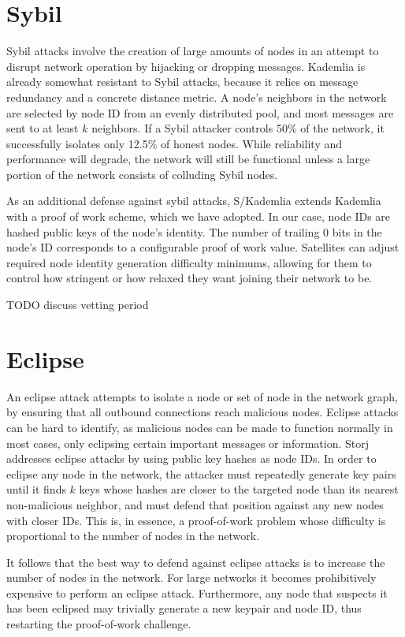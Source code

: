 \documentclass[11pt,fleqn,openany]{book}
\newcommand{\todo}[1]{{\color{red} TODO #1 }}
\begin{document}
\section{Sybil}

Sybil attacks involve the creation of large amounts of nodes in an attempt to
disrupt network operation by hijacking or dropping messages. Kademlia
\cite{kad} is already somewhat resistant to Sybil attacks, because
it relies on message redundancy and a concrete distance metric.
A node's neighbors in the network are selected by
node ID from an evenly distributed pool, and most messages are sent to at least
$k$ neighbors. If a Sybil attacker controls 50\% of the network, it
successfully isolates only 12.5\% of honest nodes. While reliability and
performance will degrade, the network will still be functional unless a large
portion of the network consists of colluding Sybil nodes.

As an additional defense against sybil attacks, S/Kademlia \cite{skad}
extends Kademlia with a proof of work scheme, which we have adopted. In our
case, node IDs are hashed public keys of the node's identity.
The number of trailing 0 bits in the node's ID corresponds to a configurable
proof of work value.
Satellites can adjust required node identity generation difficulty minimums,
allowing for them to control how stringent or how relaxed they want joining
their network to be.

\todo{discuss vetting period}

\section{Eclipse}

An eclipse attack attempts to isolate a node or set of node in the network
graph, by ensuring that all outbound connections reach malicious nodes. Eclipse
attacks can be hard to identify, as malicious nodes can be made to function
normally in most cases, only eclipsing certain important messages or
information. Storj addresses eclipse attacks by using public key hashes as node
IDs. In order to eclipse any node in the network, the attacker must repeatedly
generate key pairs until it finds $k$ keys whose hashes are closer to the
targeted node than its nearest non-malicious neighbor, and must defend that
position against any new nodes with closer IDs. This is, in essence, a
proof-of-work problem whose difficulty is proportional to the number of nodes in
the network.

It follows that the best way to defend against eclipse attacks is to increase
the number of nodes in the network. For large networks it becomes prohibitively
expensive to perform an eclipse attack. Furthermore, any node that suspects it
has been eclipsed may trivially generate a new keypair and node ID, thus
restarting the proof-of-work challenge.
\end{document}
